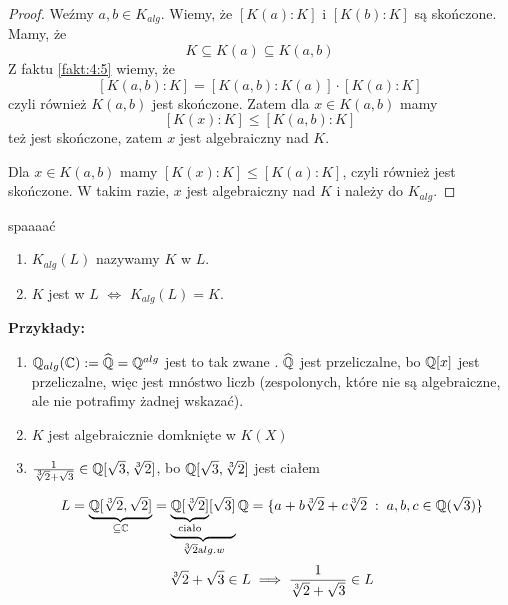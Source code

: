 \begin{proof}

Weźmy $a,b\in K_{alg}$. Wiemy, że $[K(a):K]$ i $[K(b):K]$ są skończone. Mamy, że
$$K\subseteq K(a)\subseteq K(a, b)$$
Z faktu \ref{fakt:4:5} wiemy, że 
$$[K(a, b):K]=[K(a,b):K(a)]\cdot[K(a):K]$$
czyli również $K(a,b)$ jest skończone. Zatem dla $x\in K(a,b)$ mamy
$$[K(x):K]\leq[K(a,b):K]$$
też jest skończone, zatem $x$ jest algebraiczny nad $K$.
\medskip

Dla $x\in K(a, b)$ mamy $[K(x):K]\leq[K(a):K]$, czyli również jest skończone. W takim razie, $x$ jest algebraiczny nad $K$ i należy do $K_{alg}$.
\end{proof}

\begin{definition}{\color{pagColor}spaaaać}
    \begin{enumerate}
        \item $K_{alg}(L)$ nazywamy  $K$ w $L$.
        \item $K$ jest  w $L$ $\iff$ $K_{alg}(L)=K$.
    \end{enumerate}
\end{definition}

\textbf{Przykłady:} 
\begin{enumerate}
    \item $\mathbb{Q}_{alg}(\mathbb{C}):=\widehat{\mathbb{Q}}=\mathbb{Q}^{alg}$ jest to tak zwane . $\widehat{\mathbb{Q}}$ jest przeliczalne, bo $\mathbb{Q}[x]$ jest przeliczalne, więc jest mnóstwo liczb  (zespolonych, które nie są algebraiczne, ale nie potrafimy żadnej wskazać).
    \item $K$ jest algebraicznie domknięte w $K(X)$
    \item ${1\over\sqrt[3]{2}+\sqrt{3}}\in\mathbb{Q}[\sqrt{3},\sqrt[3]{2}]$, bo $\mathbb{Q}[\sqrt{3},\sqrt[3]{2}]$ jest ciałem
    
    $$L=\underbrace{\mathbb{Q}[\sqrt[3]{2},\sqrt{2}]}_{\subseteq \mathbb{C}}=\underbrace{\underbrace{\mathbb{Q}[\sqrt[3]{2}]}_{\text{ciało}}[\sqrt3]}_{\sqrt[3]{2}\text alg. w }\mathbb{Q}=\{a+b\sqrt[3]{2}+c\sqrt[3]{2}\;:\;a,b,c\in\mathbb{Q}(\sqrt{3})\}$$
    $$\sqrt[3]{2}+\sqrt3\in L\implies{1\over\sqrt[3]{2}+\sqrt{3}}\in L$$
\end{enumerate}
